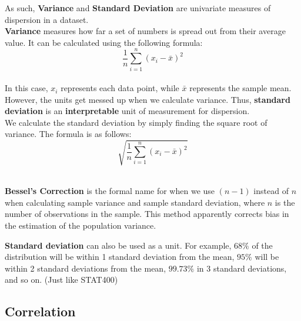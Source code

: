 \documentclass[english, 10pt]{article}
\begin{document}
{


}


\hfill \break As such, \textbf{Variance} and \textbf{Standard Deviation} are univariate measures of dispersion in a dataset.\\

\textbf{Variance} measures how far a set of numbers is spread out from their average value. It can be calculated using the following formula:\\

$$\frac{1}{n}\sum_{i=1}^{n}{(x_i-\bar{x})^2}$$\\

\hfill \break In this case, $x_i$ represents each data point, while $\bar{x}$ represents the sample mean.\\

However, the units get messed up when we calculate variance. Thus, \textbf{standard deviation} is an \textbf{interpretable} unit of measurement for dispersion.\\

We calculate the standard deviation by simply finding the square root of variance. The formula is as follows:\\

$$\sqrt{\frac{1}{n}\sum_{i=1}^{n}{(x_i-\bar{x})^2}}$$\\

\begin{tcolorbox}[title=Aside: Bessel's Correction,colframe=black,colback=white,arc=0pt,fonttitle=\bfseries]
\textbf{Bessel's Correction} is the formal name for when we use $(n-1)$ instead of $n$ when calculating sample variance and sample standard deviation, where $n$ is the number of observations in the sample. This method apparently corrects bias in the estimation of the population variance.
\end{tcolorbox}

\hfill \break \textbf{Standard deviation} can also be used as a unit. For example, $68\%$ of the distribution will be within 1 standard deviation from the mean, $95\%$ will be within 2 standard deviations from the mean, $99.73\%$ in 3 standard deviations, and so on. (Just like STAT400)

\subsection{Correlation}
\end{document}
